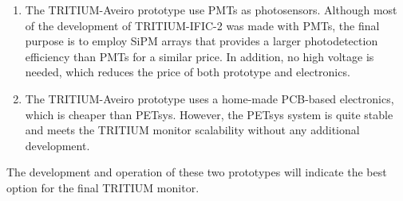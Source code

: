 \begin{enumerate}
\item{} The TRITIUM-Aveiro prototype use PMTs as photosensors. Although most of the development of TRITIUM-IFIC-2 was made with PMTs, the final purpose is to employ SiPM arrays that provides a larger photodetection efficiency than PMTs for a similar price. In addition, no high voltage is needed, which reduces the price of both prototype and electronics.

\item{} The TRITIUM-Aveiro prototype uses a home-made PCB-based electronics, which is cheaper than PETsys. However, the PETsys system is quite stable and meets the TRITIUM monitor scalability without any additional development.

\end{enumerate}

The development and operation of these two prototypes will indicate the best option for the final TRITIUM monitor.
